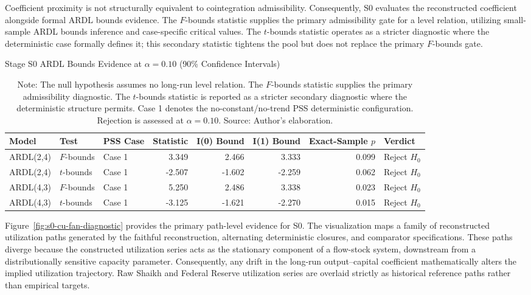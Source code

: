 \documentclass[11pt]{article}
\begin{document}
Coefficient proximity is not structurally equivalent to cointegration admissibility. Consequently, S0 evaluates the reconstructed coefficient alongside formal ARDL bounds evidence. The $F$-bounds statistic supplies the primary admissibility gate for a level relation, utilizing small-sample ARDL bounds inference and case-specific critical values. The $t$-bounds statistic operates as a stricter diagnostic where the deterministic case formally defines it; this secondary statistic tightens the pool but does not replace the primary $F$-bounds gate.
\begin{table}[H]
\centering
\caption{Stage S0 ARDL Bounds Evidence at $\alpha=0.10$ (90\% Confidence Intervals)}
\label{tab:s0_bounds_alpha10}
\footnotesize
\begin{tabular}{lllrrrrl}
\toprule
Model & Test & PSS Case & Statistic & I(0) Bound & I(1) Bound & Exact-Sample $p$ & Verdict \\
\midrule
\midrule
ARDL(2,4) & $F$-bounds & Case 1 & 3.349 & 2.466 & 3.333 & 0.099 & Reject $H_0$ \\
ARDL(2,4) & $t$-bounds & Case 1 & -2.507 & -1.602 & -2.259 & 0.062 & Reject $H_0$ \\
ARDL(4,3) & $F$-bounds & Case 1 & 5.250 & 2.486 & 3.338 & 0.023 & Reject $H_0$ \\
ARDL(4,3) & $t$-bounds & Case 1 & -3.125 & -1.621 & -2.270 & 0.015 & Reject $H_0$ \\
\bottomrule
\end{tabular}
\caption*{Note: The null hypothesis assumes no long-run level relation. The $F$-bounds statistic supplies the primary admissibility diagnostic. The $t$-bounds statistic is reported as a stricter secondary diagnostic where the deterministic structure permits. Case 1 denotes the no-constant/no-trend PSS deterministic configuration. Rejection is assessed at $\alpha=0.10$. Source: Author's elaboration.}
\end{table}

Figure~\ref{fig:s0-cu-fan-diagnostic} provides the primary path-level evidence for S0. The visualization maps a family of reconstructed utilization paths generated by the faithful reconstruction, alternating deterministic closures, and comparator specifications. These paths diverge because the constructed utilization series acts as the stationary component of a flow-stock system, downstream from a distributionally sensitive capacity parameter. Consequently, any drift in the long-run output--capital coefficient mathematically alters the implied utilization trajectory. Raw Shaikh and Federal Reserve utilization series are overlaid strictly as historical reference paths rather than empirical targets.
\end{document}
